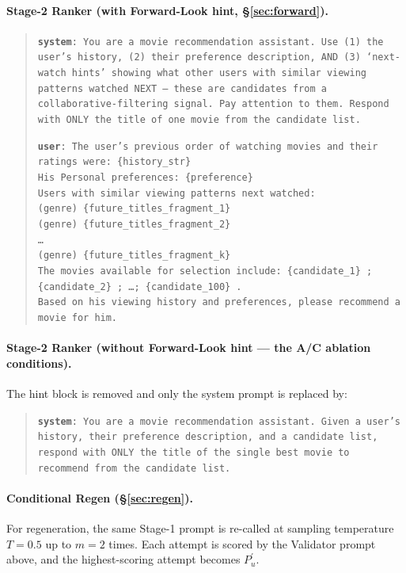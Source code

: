 \documentclass[11pt]{article}
\begin{document}
\paragraph{Stage-2 Ranker (with Forward-Look hint,
\S\ref{sec:forward}).}
\begin{quote}
\small
\texttt{\textbf{system}: You are a movie recommendation assistant.
Use (1) the user's history, (2) their preference description, AND
(3) `next-watch hints' showing what other users with similar viewing
patterns watched NEXT --- these are candidates from a
collaborative-filtering signal. Pay attention to them. Respond with
ONLY the title of one movie from the candidate list.}

\texttt{\textbf{user}: The user's previous order of watching movies
and their ratings were: \{history\_str\}}\\
\texttt{His Personal preferences: \{preference\}}\\
\texttt{Users with similar viewing patterns next watched:}\\
\texttt{\hphantom{xx}(genre) \{future\_titles\_fragment\_1\}}\\
\texttt{\hphantom{xx}(genre) \{future\_titles\_fragment\_2\}}\\
\texttt{\hphantom{xx}\ldots}\\
\texttt{\hphantom{xx}(genre) \{future\_titles\_fragment\_k\}}\\
\texttt{The movies available for selection include: \{candidate\_1\} ;
\{candidate\_2\} ; \ldots ; \{candidate\_100\} .}\\
\texttt{Based on his viewing history and preferences, please
recommend a movie for him.}
\end{quote}

\paragraph{Stage-2 Ranker (without Forward-Look hint --- the A/C
ablation conditions).}
The hint block is removed and only the system prompt is replaced by:
\begin{quote}
\small
\texttt{\textbf{system}: You are a movie recommendation assistant.
Given a user's history, their preference description, and a
candidate list, respond with ONLY the title of the single best movie
to recommend from the candidate list.}
\end{quote}

\paragraph{Conditional Regen (\S\ref{sec:regen}).}
For regeneration, the same Stage-1 prompt is re-called at sampling
temperature $T{=}0.5$ up to $m{=}2$ times. Each attempt is scored by
the Validator prompt above, and the highest-scoring attempt becomes
$P_u^{'}$.
\end{document}
